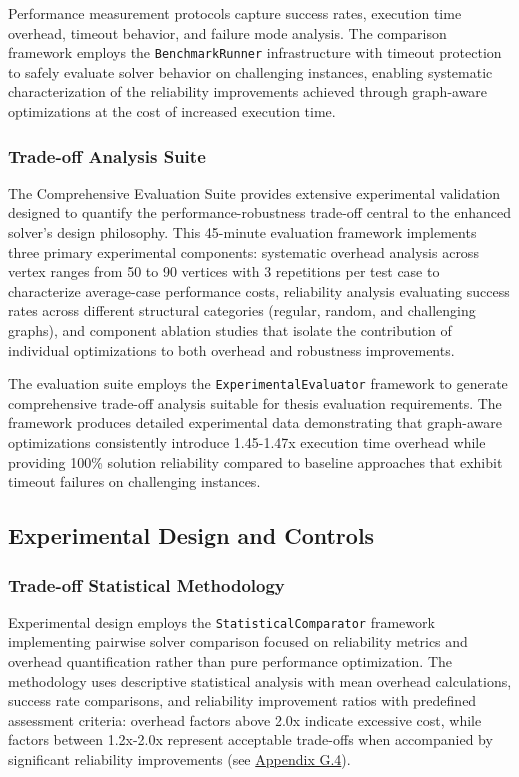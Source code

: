 Performance measurement protocols capture success rates, execution time overhead, timeout behavior, and failure mode analysis. The comparison framework employs the \texttt{BenchmarkRunner} infrastructure with timeout protection to safely evaluate solver behavior on challenging instances, enabling systematic characterization of the reliability improvements achieved through graph-aware optimizations at the cost of increased execution time.

\subsubsection{Trade-off Analysis Suite}
\label{sec:comprehensive-evaluation-suite}
The Comprehensive Evaluation Suite provides extensive experimental validation designed to quantify the performance-robustness trade-off central to the enhanced solver's design philosophy. This 45-minute evaluation framework implements three primary experimental components: systematic overhead analysis across vertex ranges from 50 to 90 vertices with 3 repetitions per test case to characterize average-case performance costs, reliability analysis evaluating success rates across different structural categories (regular, random, and challenging graphs), and component ablation studies that isolate the contribution of individual optimizations to both overhead and robustness improvements.

The evaluation suite employs the \texttt{ExperimentalEvaluator} framework to generate comprehensive trade-off analysis suitable for thesis evaluation requirements. The framework produces detailed experimental data demonstrating that graph-aware optimizations consistently introduce 1.45-1.47x execution time overhead while providing 100\% solution reliability compared to baseline approaches that exhibit timeout failures on challenging instances.

\subsection{Experimental Design and Controls}
\label{sec:experimental-design}

\subsubsection{Trade-off Statistical Methodology}
\label{sec:statistical-methodology}
Experimental design employs the \texttt{StatisticalComparator} framework implementing pairwise solver comparison focused on reliability metrics and overhead quantification rather than pure performance optimization. The methodology uses descriptive statistical analysis with mean overhead calculations, success rate comparisons, and reliability improvement ratios with predefined assessment criteria: overhead factors above 2.0x indicate excessive cost, while factors between 1.2x-2.0x represent acceptable trade-offs when accompanied by significant reliability improvements (see \hyperref[appendix:statistical-analysis]{Appendix G.4}).

